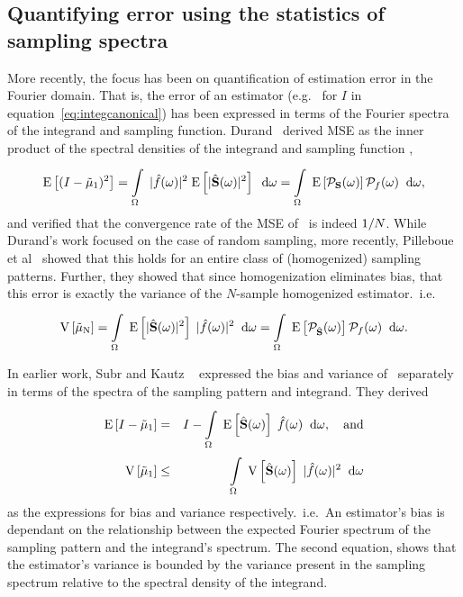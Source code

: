 \subsection{Quantifying error using the statistics of sampling spectra}
More recently, the focus has been on quantification of estimation error in the Fourier domain. That is, the error of an estimator (e.g.~ for $I$ in equation~\ref{eq:integcanonical}) has been expressed in terms of the Fourier spectra of the integrand and sampling function. 
Durand~\cite{durand2011frequency} derived MSE as the inner product of the spectral densities of the integrand and sampling function
, 
\begin{equation} \label{eq:durand11}
   \mathrm{E} \left[(I-\tilde\mu_\mathrm{1})^2 \right] = \displaystyle\int\limits_{\Omega}^{} \; |\hat{f}(\omega)|^2 \; \mathrm{E} \left[|\hat{\mathbf{S}}(\omega)|^2 \right] \;\; \mathrm{d}\omega = \displaystyle\int\limits_{\Omega}^{} \; \mathrm{E} \left[\mathcal{P}_{\mathbf{S}}(\omega) \right] \mathcal{P}_{f}(\omega) \;\; \mathrm{d}\omega ,
\end{equation}
and verified that the convergence rate of the MSE of \estim{\N}\ is indeed $1/N$. While Durand's work focused on the case of random sampling, more recently, Pilleboue et al~\cite{Pilleboue:2015:VAM} showed that this holds for an entire class of (homogenized) sampling patterns. Further, they showed that since homogenization eliminates bias, that this error is exactly the variance of the $N$-sample homogenized estimator.~i.e.
\begin{equation} \label{eq:pillebouevar}
\mathrm{V} \left[\tilde\mu_\mathrm{N}\right] 
= \displaystyle\int\limits_{\Omega}^{} \; \mathrm{E} \left[|\hat{\mathbf{S}}(\omega)|^2 \right]\;|\hat{f}(\omega)|^2 \;\; \mathrm{d}\omega 
= \displaystyle\int\limits_{\Omega}^{} \; \mathrm{E} \left[\mathcal{P}_{\hat{\mathbf{S}}}(\omega) \right] \mathcal{P}_{f}(\omega) \;\; \mathrm{d}\omega. 
\end{equation}

In earlier work, Subr and Kautz ~\cite{Subr:2013:FAS} expressed the bias and variance of \ separately in terms of the spectra of the sampling pattern and integrand. They derived
\begin{eqnarray}
  \mathrm{E} \left[I-\tilde\mu_\mathrm{1} \right] &=& I - \displaystyle\int\limits_{\Omega}^{} \; \mathrm{E} \left[\hat{\mathbf{S}}(\omega) \right] \; \hat{f}(\omega)  \;\; \mathrm{d}\omega, \quad \mathrm{and} \\
    \mathrm{V} \left[\tilde\mu_\mathrm{1}\right] &\leq& \displaystyle\int\limits_{\Omega}^{} \; \mathrm{V} \left[\hat{\mathbf{S}}(\omega)\right] \; |\hat{f}(\omega)|^2 \;\; \mathrm{d}\omega
\end{eqnarray}
as the expressions for bias and variance respectively.~i.e.~An estimator's bias is dependant on the relationship between the expected Fourier spectrum of the sampling pattern and the integrand's spectrum. The second equation, shows that the estimator's variance is bounded by the variance present in the sampling spectrum relative to the spectral density of the integrand. 

